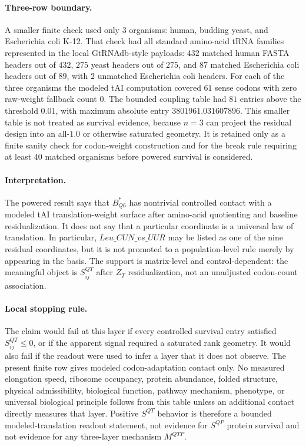 \paragraph{Three-row boundary.}
A smaller finite check used only $3$ organisms: human, budding yeast, and Escherichia coli K-12.  That check had all standard amino-acid tRNA families represented in the local GtRNAdb-style payloads: $432$ matched human FASTA headers out of $432$, $275$ yeast headers out of $275$, and $87$ matched Escherichia coli headers out of $89$, with $2$ unmatched Escherichia coli headers.  For each of the three organisms the modeled tAI computation covered $61$ sense codons with zero raw-weight fallback count $0$.  The bounded coupling table had $81$ entries above the threshold $0.01$, with maximum absolute entry $3801961.031607896$.  This smaller table is not treated as survival evidence, because $n=3$ can project the residual design into an all-$1.0$ or otherwise saturated geometry.  It is retained only as a finite sanity check for codon-weight construction and for the break rule requiring at least $40$ matched organisms before powered survival is considered.

\paragraph{Interpretation.}
The powered result says that $B^{*}_{Q6}$ has nontrivial controlled contact with a modeled tAI translation-weight surface after amino-acid quotienting and baseline residualization.  It does not say that a particular coordinate is a universal law of translation.  In particular, $Leu\_CUN\_vs\_UUR$ may be listed as one of the nine residual coordinates, but it is not promoted to a population-level rule merely by appearing in the basis.  The support is matrix-level and control-dependent: the meaningful object is $S^{QT}_{ij}$ after $Z_T$ residualization, not an unadjusted codon-count association.

\paragraph{Local stopping rule.}
The claim would fail at this layer if every controlled survival entry satisfied $S^{QT}_{ij}\leq 0$, or if the apparent signal required a saturated rank geometry.  It would also fail if the readout were used to infer a layer that it does not observe.  The present finite row gives modeled codon-adaptation contact only.  No measured elongation speed, ribosome occupancy, protein abundance, folded structure, physical admissibility, biological function, pathway mechanism, phenotype, or universal biological principle follows from this table unless an additional contact directly measures that layer.  Positive $S^{QT}$ behavior is therefore a bounded modeled-translation readout statement, not evidence for $S^{QP}$ protein survival and not evidence for any three-layer mechanism $M^{QTP}$.

